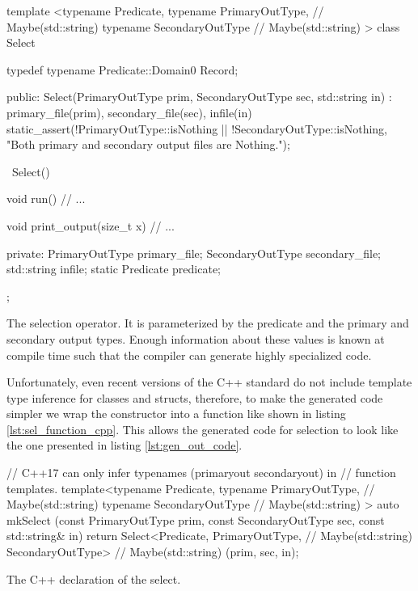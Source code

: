 \begin{code}
\begin{cppcode}
template <typename Predicate,
          typename PrimaryOutType,   // Maybe(std::string)
          typename SecondaryOutType  // Maybe(std::string)
          >
class Select {
  typedef typename Predicate::Domain0 Record;

public:
  Select(PrimaryOutType prim, SecondaryOutType sec, std::string in)
    : primary_file(prim), secondary_file(sec), infile(in) {
    static_assert(!PrimaryOutType::isNothing || !SecondaryOutType::isNothing,
                  "Both primary and secondary output files are Nothing.");
  }

  ~Select() {}

  void run() {
    // ...
  }

  void print_output(size_t x) {
    // ...
  }

private:
  PrimaryOutType primary_file;
  SecondaryOutType secondary_file;
  std::string infile;
  static Predicate predicate;
};
\end{cppcode}
  \caption{\label{lst:sel_operator_cpp}The selection operator. It is
    parameterized by the predicate and the primary and secondary
    output types. Enough information about these values is known at
    compile time such that the compiler can generate highly
    specialized code.}
\end{code}

Unfortunately, even recent versions of the C++ standard do not
include template type inference for classes and structs, therefore, to
make the generated code simpler we wrap the constructor into a
function like shown in listing \ref{lst:sel_function_cpp}. This allows the
generated code for selection to look like the one presented in listing
\ref{lst:gen_out_code}.

\begin{code}
\begin{cppcode}
// C++17 can only infer typenames (primaryout secondaryout) in
// function templates.
template<typename Predicate,
         typename PrimaryOutType,   // Maybe(std::string)
         typename SecondaryOutType  // Maybe(std::string)
         >
auto mkSelect (const PrimaryOutType prim,
               const SecondaryOutType sec,
               const std::string& in) {
  return Select<Predicate,
                PrimaryOutType,   // Maybe(std::string)
                SecondaryOutType> // Maybe(std::string)
    (prim, sec, in);
}
\end{cppcode}
\caption{\label{lst:sel_function_cpp}The C++ declaration of the select.}
\end{code}


